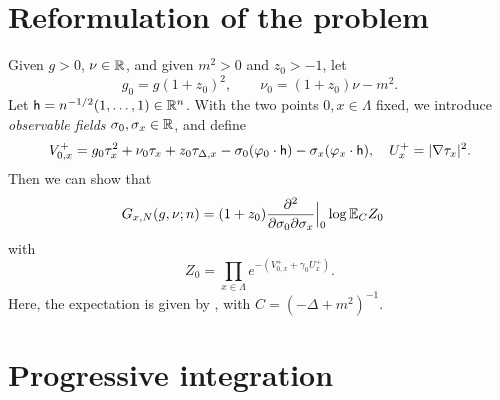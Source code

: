 
\section{Reformulation of the problem}

Given $g>0$, $\nu\in {\mathbb R}$, and  given $m^2>0$ and $z_0 >-1$, let
\begin{equation}
  \label{e:gg0}
  g_0 = g(1+z_0)^2, \quad \quad
  \nu_0 = (1+z_0)\nu-m^2.
\end{equation}
Let ${\sf h} = n^{-1/2}(1, \ldots, 1) \in {\mathbb R}^n$.
With the two points $0,x\in \Lambda$ fixed,
we introduce \emph{observable fields} $\sigma_0, \sigma_x \in {\mathbb R}$, and define
\begin{equation}
\label{e:V0def}
  V^+_{0,x}
  = g_0\tau_x^2 + \nu_0 \tau_x + z_0 \tau_{\Delta,x} -
    \sigma_0 (\varphi_{0} \cdot {\sf h})
    - \sigma_x (\varphi_{x} \cdot {\sf h}),
  \quad
  U^+_x = |\nabla \tau_x|^2.
\end{equation}
Then we can show that
\begin{align}
\label{e:generating-fn}
    G_{x,N}(g, \nu; n)
    &=
    (1+z_0)
    \frac{\partial^2 }{\partial \sigma_0  \partial \sigma_x }
    \Big|_{0}
    \log
    \mathbb{E}_C  Z_0
\end{align}
with
\begin{equation}
\label{e:Z0def}
  Z_0
  =
  \prod_{x\in \Lambda} e^{-(V^+_{0,x} + \gamma_0 U^+_x)}.
\end{equation}
Here, the expectation is given by , with $C = (-\Delta + m^2)^{-1}$.


\section{Progressive integration}
\label{sec:prog}

